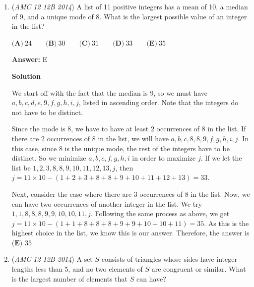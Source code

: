 \begin{enumerate}
\textbf{Solution 2}

Let the number of hours Danica drove be $k$. Then we know that $100a + 10b + c + 55k$ = $100c + 10b + a$. Simplifying, we have $99c - 99a = 55k$, or $9c - 9a = 5k$. Thus, k is divisible by $9$. Because $55 * 18 = 990$, $k$ must be $9$, and therefore $c - a = 5$. Because $a + b + c \leq{7}$ and $a \geq{1}$, $a = 1$, $c = 6$ and $b = 0$, and our answer is $a^2 + b^2 + c^2 = 6^2 + 0^2 + 1^2 = 37$, or $\boxed{D}$.

 


 


	\item (\textit{AMC 12 12B 2014}) A list of 11 positive integers has a mean of 10, a median of 9, and a unique mode of 8. What is the largest possible value of an integer in the list?


 $\textbf{(A)}\ 24\qquad\textbf{(B)}\ 30\qquad\textbf{(C)}\ 31\qquad\textbf{(D)}\ 33\qquad\textbf{(E)}\ 35$

 \textbf{Answer: }E



\textbf{Solution}

We start off with the fact that the median is $9$, so we must have $a, b, c, d, e, 9, f, g, h, i, j$, listed in ascending order. Note that the integers do not have to be distinct. 

 Since the mode is $8$, we have to have at least $2$ occurrences of $8$ in the list. If there are $2$ occurrences of $8$ in the list, we will have $a, b, c, 8, 8, 9, f, g, h, i, j$. In this case, since $8$ is the unique mode, the rest of the integers have to be distinct. So we minimize $a,b,c,f,g,h,i$ in order to maximize $j$. If we let the list be $1,2,3,8,8,9,10,11,12,13,j$, then $j = 11 \times 10 - (1+2+3+8+8+9+10+11+12+13) = 33$. 

 Next, consider the case where there are $3$ occurrences of $8$ in the list. Now, we can have two occurrences of another integer in the list. We try $1,1,8,8,8,9,9,10,10,11,j$. Following the same process as above, we get $j = 11 \times 10 - (1+1+8+8+8+9+9+10+10+11) = 35$. As this is the highest choice in the list, we know this is our answer. Therefore, the answer is $\boxed{\textbf{(E) }35}$



	\item (\textit{AMC 12 12B 2014}) A set $S$ consists of triangles whose sides have integer lengths less than 5, and no two elements of $S$ are congruent or similar. What is the largest number of elements that $S$ can have?



\end{enumerate}

